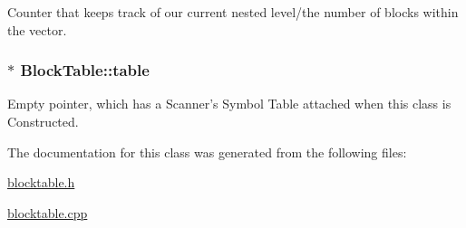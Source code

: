 Counter that keeps track of our current nested level/the number of blocks within the vector. 

\hypertarget{classBlockTable_af9fff1a8017fac6c965910c1484d3d09}{
\subsubsection[{table}]{$\ast$ {\bf BlockTable::table}}}
\label{classBlockTable_af9fff1a8017fac6c965910c1484d3d09}


Empty pointer, which has a Scanner's Symbol Table attached when this class is Constructed. 



The documentation for this class was generated from the following files:\begin{DoxyCompactItemize}
\item 
\hyperlink{blocktable_8h}{blocktable.h}\item 
\hyperlink{blocktable_8cpp}{blocktable.cpp}\end{DoxyCompactItemize}
